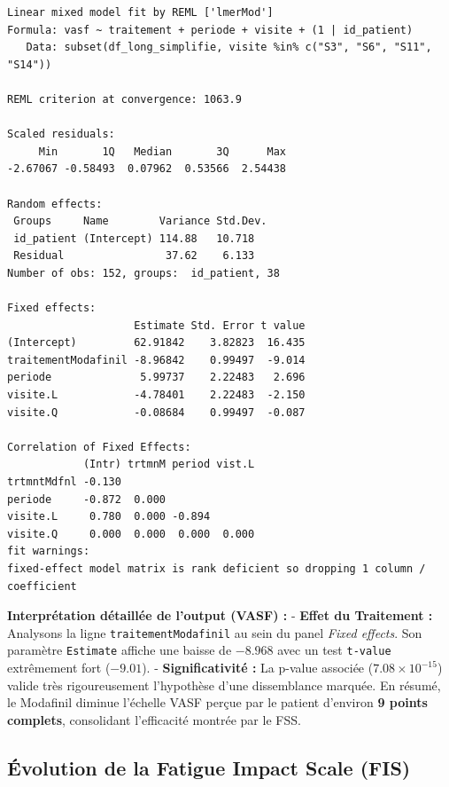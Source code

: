 \documentclass[
  letterpaper,
  DIV=11,
  numbers=noendperiod]{scrartcl}
\begin{document}
\begin{verbatim}
Linear mixed model fit by REML ['lmerMod']
Formula: vasf ~ traitement + periode + visite + (1 | id_patient)
   Data: subset(df_long_simplifie, visite %in% c("S3", "S6", "S11", "S14"))

REML criterion at convergence: 1063.9

Scaled residuals: 
     Min       1Q   Median       3Q      Max 
-2.67067 -0.58493  0.07962  0.53566  2.54438 

Random effects:
 Groups     Name        Variance Std.Dev.
 id_patient (Intercept) 114.88   10.718  
 Residual                37.62    6.133  
Number of obs: 152, groups:  id_patient, 38

Fixed effects:
                    Estimate Std. Error t value
(Intercept)         62.91842    3.82823  16.435
traitementModafinil -8.96842    0.99497  -9.014
periode              5.99737    2.22483   2.696
visite.L            -4.78401    2.22483  -2.150
visite.Q            -0.08684    0.99497  -0.087

Correlation of Fixed Effects:
            (Intr) trtmnM period vist.L
trtmntMdfnl -0.130                     
periode     -0.872  0.000              
visite.L     0.780  0.000 -0.894       
visite.Q     0.000  0.000  0.000  0.000
fit warnings:
fixed-effect model matrix is rank deficient so dropping 1 column / coefficient
\end{verbatim}

\textbf{Interprétation détaillée de l'output (VASF) :} - \textbf{Effet
du Traitement :} Analysons la ligne \texttt{traitementModafinil} au sein
du panel \emph{Fixed effects}. Son paramètre \texttt{Estimate} affiche
une baisse de \textbf{\(-8.968\)} avec un test \texttt{t-value}
extrêmement fort (\(-9.01\)). - \textbf{Significativité :} La p-value
associée (\(7.08 \times 10^{-15}\)) valide très rigoureusement
l'hypothèse d'une dissemblance marquée. En résumé, le Modafinil diminue
l'échelle VASF perçue par le patient d'environ \textbf{9 points
complets}, consolidant l'efficacité montrée par le FSS.

\subsection{Évolution de la Fatigue Impact Scale
(FIS)}\label{uxe9volution-de-la-fatigue-impact-scale-fis}
\end{document}
